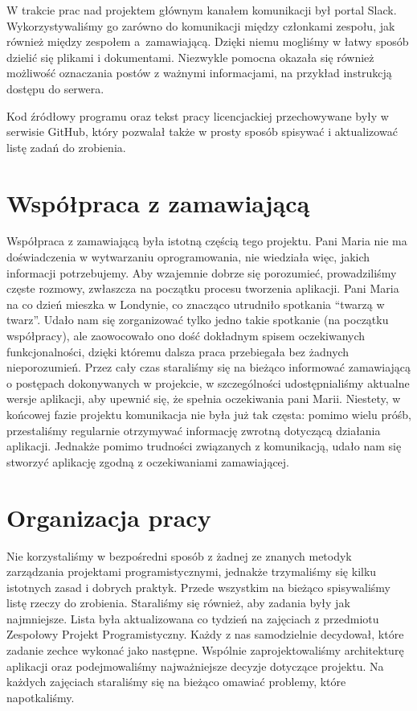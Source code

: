 \documentclass[licencjacka]{pracamgr}
\begin{document}
W trakcie prac nad projektem głównym kanałem komunikacji był portal Slack. Wykorzystywaliśmy go zarówno do komunikacji między członkami zespołu, jak również między zespołem a~zamawiającą. Dzięki niemu mogliśmy w łatwy sposób dzielić się plikami i dokumentami. Niezwykle pomocna okazała się również możliwość oznaczania postów z ważnymi informacjami, na przykład instrukcją dostępu do serwera.

Kod źródłowy programu oraz tekst pracy licencjackiej przechowywane były w serwisie \mbox{GitHub}, który pozwalał także w prosty sposób spisywać i aktualizować listę zadań do zrobienia.

\section{Współpraca z zamawiającą}
Współpraca z zamawiającą była istotną częścią tego projektu. Pani Maria nie ma doświadczenia w wytwarzaniu oprogramowania, nie wiedziała więc, jakich informacji potrzebujemy. Aby wzajemnie dobrze się porozumieć, prowadziliśmy częste rozmowy, zwłaszcza na początku procesu tworzenia aplikacji. Pani Maria na co dzień mieszka w Londynie, co znacząco utrudniło spotkania ``twarzą w twarz''. Udało nam się zorganizować tylko jedno takie spotkanie (na początku współpracy), ale zaowocowało ono dość dokładnym spisem oczekiwanych funkcjonalności, dzięki któremu dalsza praca przebiegała bez żadnych nieporozumień. Przez cały czas staraliśmy się na bieżąco informować zamawiającą o postępach dokonywanych w projekcie, w szczególności udostępnialiśmy aktualne wersje aplikacji, aby upewnić się, że spełnia oczekiwania pani Marii. Niestety, w końcowej fazie projektu komunikacja nie była już tak częsta: pomimo wielu próśb, przestaliśmy regularnie otrzymywać informację zwrotną dotyczącą działania aplikacji. Jednakże pomimo trudności związanych z komunikacją, udało nam się stworzyć aplikację zgodną z oczekiwaniami zamawiającej.

\section{Organizacja pracy}

Nie korzystaliśmy w bezpośredni sposób z żadnej ze znanych metodyk zarządzania projektami programistycznymi, jednakże trzymaliśmy się kilku istotnych zasad i dobrych praktyk. Przede wszystkim na bieżąco spisywaliśmy listę rzeczy do zrobienia. Staraliśmy się również, aby zadania były jak najmniejsze. Lista była aktualizowana co tydzień na zajęciach z przedmiotu Zespołowy Projekt Programistyczny. Każdy z nas samodzielnie decydował, które zadanie zechce wykonać jako następne. Wspólnie zaprojektowaliśmy architekturę aplikacji oraz podejmowaliśmy najważniejsze decyzje dotyczące projektu. Na każdych zajęciach staraliśmy się na bieżąco omawiać problemy, które napotkaliśmy.
\end{document}
